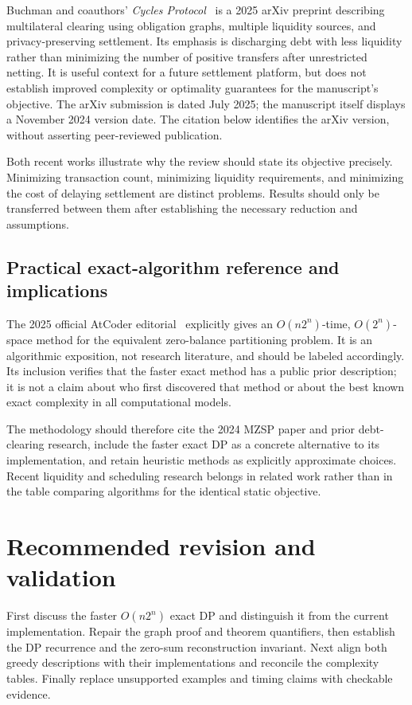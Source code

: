 \documentclass[11pt]{article}
\begin{document}
Buchman and coauthors' \emph{Cycles Protocol}~\cite{buchman2025} is a
2025 arXiv preprint describing multilateral clearing using obligation
graphs, multiple liquidity sources, and privacy-preserving settlement.
Its emphasis is discharging debt with less liquidity rather than minimizing
the number of positive transfers after unrestricted netting. It is useful
context for a future settlement platform, but does not establish improved
complexity or optimality guarantees for the manuscript's objective. The
arXiv submission is dated July 2025; the manuscript itself displays a
November 2024 version date. The citation below identifies the arXiv
version, without asserting peer-reviewed publication.

Both recent works illustrate why the review should state its objective
precisely. Minimizing transaction count, minimizing liquidity requirements,
and minimizing the cost of delaying settlement are distinct problems.
Results should only be transferred between them after establishing the
necessary reduction and assumptions.

\subsection{Practical exact-algorithm reference and implications}

The 2025 official AtCoder editorial~\cite{atcoder2025} explicitly gives
an $O(n2^n)$-time, $O(2^n)$-space method for the equivalent zero-balance
partitioning problem. It is an algorithmic exposition, not research
literature, and should be labeled accordingly. Its inclusion verifies
that the faster exact method has a public prior description; it is not
a claim about who first discovered that method or about the best known
exact complexity in all computational models.

The methodology should therefore cite the 2024 MZSP paper and prior
debt-clearing research,
include the faster exact DP as a concrete alternative to its implementation,
and retain heuristic methods as explicitly approximate choices. Recent
liquidity and scheduling research belongs in related work rather than
in the table comparing algorithms for the identical static objective.

\section{Recommended revision and validation}

First discuss the faster $O(n2^n)$ exact DP and distinguish it from the
current implementation. Repair the graph proof and theorem quantifiers,
then establish the
DP recurrence and the zero-sum reconstruction invariant. Next align both
greedy descriptions with their implementations and reconcile the complexity
tables. Finally replace unsupported examples and timing claims with
checkable evidence.
\end{document}
